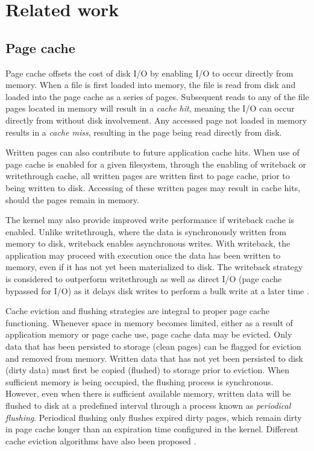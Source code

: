 \chapter{Related work}
\label{relatedwork}

\section{Page cache}

Page cache offsets the cost of disk I/O by enabling I/O to occur directly from memory.
When a file is first loaded into memory, the file is read from disk and loaded into the page cache as
a series of pages. Subsequent reads to any of the file pages located in memory will result in
a \textit{cache hit}, meaning the I/O can occur directly from without disk involvement.
Any accessed page not loaded in memory results in a \textit{cache miss}, resulting in
the page being read directly from disk.

Written pages can also contribute to future application cache hits. When use of page cache
is enabled for a given filesystem, through the enabling of writeback or writethrough cache,
all written pages are written first to page cache, prior to being written to disk.
Accessing of these written pages may result in cache hits, should the pages remain in memory.

The kernel may also provide improved write performance if writeback cache is enabled. Unlike writethrough,
where the data is synchronously written from memory to disk, writeback enables asynchronous writes.
With writeback, the application may proceed with execution once the data has been
written to memory, even if it has not yet been materialized to disk.  
The writeback strategy is considered to outperform writethrough as well as
direct I/O (page cache bypassed for I/O) as it delays disk writes to perform a bulk write at a later time
\cite{linuxdev3rd2010}.

Cache eviction and flushing strategies are integral to proper page cache functioning.
Whenever space in memory becomes limited, either as a result of application memory
or page cache use, page cache data may be evicted. Only data that
has been persisted to storage (clean pages) can be flagged for eviction and removed from
memory. Written data that has not yet been persisted to disk (dirty data) must first
be copied (flushed) to storage prior to eviction. When sufficient memory is
being occupied, the flushing process is synchronous. However, even when
there is sufficient available memory, written data will be flushed to disk
at a predefined interval through a process known as \textit{periodical flushing}.
Periodical flushing only flushes expired dirty pages, which remain dirty in
page cache longer than an expiration time configured in the kernel.
Different cache eviction algorithms have also been proposed
\cite{owda2014comparison}.

